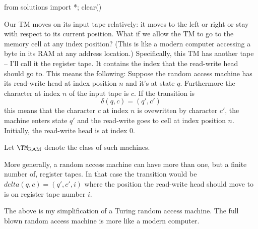 \begin{python0}
from solutions import *; clear()
\end{python0}

Our TM moves on its input tape relatively: it moves to the left or right or
stay with respect to its current position.
What if we allow the TM to go to the memory cell at any index
position?
(This is like a modern computer accessing a byte in its RAM at
any address location.)
Specifically, this TM has another tape -- I'll call it the register tape.
It contains the index that the read-write head should go to.
This means the following:
Suppose the random access machine has its read-write head at index
position $n$ and it's at state $q$.
Furthermore the character at index $n$ of the input tape is $c$.
If the transition is
\[
\delta(q, c) = (q', c')
\]
this means that the character $c$ at index $n$ is ovewritten by character
$c'$, the machine enters state $q'$ and the read-write goes to
cell at index position $n$.
Initially, the read-write head is at index 0.

Let $\TM_{\operatorname{RAM}}$ denote the class of such machines.



More generally, a random access machine can have more than one, but a
finite number of, register tapes.
In that case the transition would be $delta(q, c) = (q', c', i)$
where the position the read-write head should move to is on register
tape number $i$.

The above is my simplification of a Turing random access machine.
The full blown random access machine is more like a modern computer.

